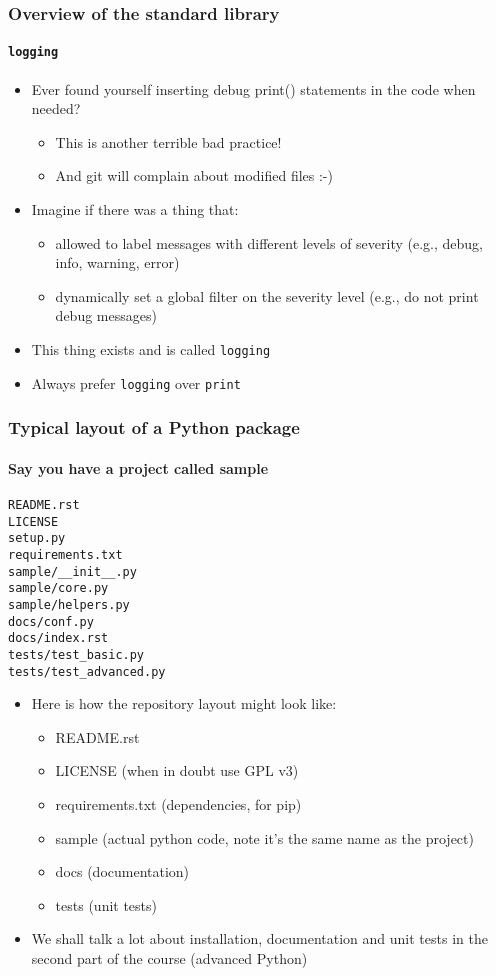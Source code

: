 \documentclass[9pt]{beamer}
\begin{document}
\begin{frame}
  \frametitle{Overview of the standard library}
  \framesubtitle{\texttt{logging}}
  \begin{itemize}
  \item Ever found yourself inserting debug print() statements in the code
    when needed?
    \begin{itemize}
    \item This is another terrible bad practice!
    \item And git will complain about modified files :-)
    \end{itemize}
  \item Imagine if there was a thing that:
    \begin{itemize}
    \item allowed to label messages with different levels of severity
      (e.g., debug, info, warning, error)
    \item dynamically set a global filter on the severity level
      (e.g., do not print debug messages)
    \end{itemize}
  \item This thing exists and is called \texttt{logging}
  \item \alert{Always prefer \texttt{logging} over \texttt{print}}
  \end{itemize}
\end{frame}


\begin{frame}[fragile]
  \frametitle{Typical layout of a Python package}
  \framesubtitle{Say you have a project called sample}
  \begin{Verbatim}
README.rst
LICENSE
setup.py
requirements.txt
sample/__init__.py
sample/core.py
sample/helpers.py
docs/conf.py
docs/index.rst
tests/test_basic.py
tests/test_advanced.py    
  \end{Verbatim}

  \medskip

  \begin{itemize}
  \item Here is how the repository layout might look like:
    \begin{itemize}
    \item README.rst
    \item LICENSE (when in doubt use GPL v3)
    \item requirements.txt (dependencies, for pip)
    \item sample (actual python code, note it's the same name as the project)
    \item docs (documentation)
    \item tests (unit tests)
    \end{itemize}
  \item We shall talk a lot about installation, documentation and unit tests
    in the second part of the course (advanced Python)
  \end{itemize}
\end{frame}
\end{document}
